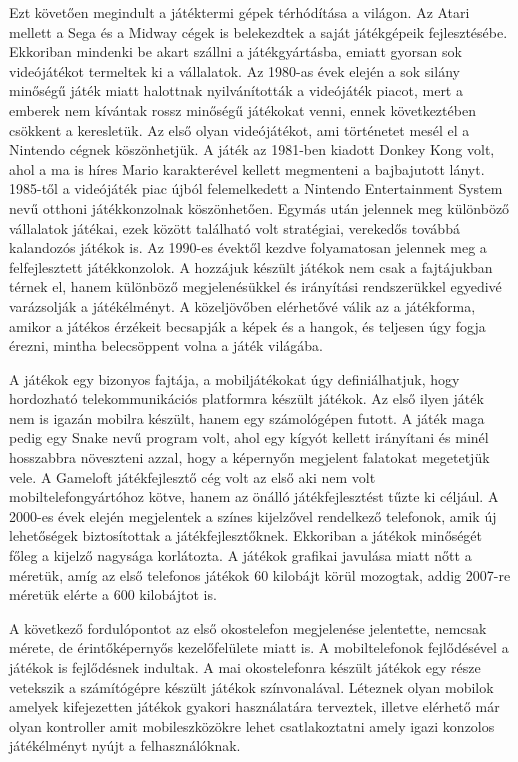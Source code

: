 Ezt követően megindult a játéktermi gépek térhódítása a világon. 
Az Atari mellett a Sega és a Midway cégek is belekezdtek a saját játékgépeik fejlesztésébe. 
Ekkoriban mindenki be akart szállni a játékgyártásba, emiatt gyorsan sok videójátékot termeltek ki a vállalatok. 
Az 1980-as évek elején a sok silány minőségű játék miatt halottnak nyilvánították a videójáték piacot, mert a emberek nem kívántak rossz minőségű játékokat venni, ennek következtében csökkent a keresletük. 
Az első olyan videójátékot, ami történetet mesél el a Nintendo cégnek köszönhetjük. 
A játék az 1981-ben kiadott Donkey Kong volt, ahol a ma is híres Mario karakterével kellett megmenteni a bajbajutott lányt. 
1985-től a videójáték piac újból felemelkedett a Nintendo Entertainment System nevű otthoni játékkonzolnak köszönhetően. 
Egymás után jelennek meg különböző vállalatok játékai, ezek között található volt stratégiai, verekedős továbbá kalandozós játékok is. 
Az 1990-es évektől kezdve folyamatosan jelennek meg a felfejlesztett játékkonzolok. 
A hozzájuk készült játékok nem csak a fajtájukban térnek el, hanem különböző megjelenésükkel és irányítási rendszerükkel egyedivé varázsolják a játékélményt. 
A közeljövőben elérhetővé válik az a játékforma, amikor a játékos érzékeit becsapják a képek és a hangok, és teljesen úgy fogja érezni, mintha belecsöppent volna a játék világába. 

A játékok egy bizonyos fajtája, a mobiljátékokat úgy definiálhatjuk, hogy hordozható telekommunikációs platformra készült játékok. 
Az első ilyen játék nem is igazán mobilra készült, hanem egy számológépen futott. 
A játék maga pedig egy Snake nevű program volt, ahol egy kígyót kellett irányítani és minél hosszabbra növeszteni azzal, hogy a képernyőn megjelent falatokat megetetjük vele. 
A Gameloft játékfejlesztő cég volt az első aki nem volt mobiltelefongyártóhoz kötve, hanem az önálló játékfejlesztést tűzte ki céljául. 
A 2000-es évek elején megjelentek a színes kijelzővel rendelkező telefonok, amik új lehetőségek biztosítottak a játékfejlesztőknek. 
Ekkoriban a játékok minőségét főleg a kijelző nagysága korlátozta. 
A játékok grafikai javulása miatt nőtt a méretük, amíg az első telefonos játékok 60 kilobájt körül mozogtak, addig 2007-re méretük elérte a 600 kilobájtot is. 

A következő fordulópontot az első okostelefon megjelenése jelentette, nemcsak mérete, de érintőképernyős kezelőfelülete miatt is. 
A mobiltelefonok fejlődésével a játékok is fejlődésnek indultak. 
A mai okostelefonra készült játékok egy része vetekszik a számítógépre készült játékok színvonalával. 
Léteznek olyan mobilok amelyek kifejezetten játékok gyakori használatára terveztek, illetve elérhető már olyan kontroller amit mobileszközökre lehet csatlakoztatni amely igazi konzolos játékélményt nyújt a felhasználóknak. 


